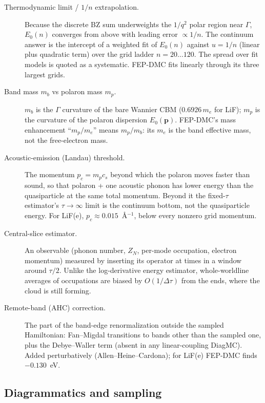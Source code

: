 \documentclass[11pt]{article}
\newcommand{\term}[1]{\item[#1.]}
\begin{document}
\begin{description}
\term{Thermodynamic limit / $1/n$ extrapolation} Because the discrete BZ sum
  underweights the $1/q^{2}$ polar region near $\Gamma$, $E_{0}(n)$ converges from
  above with leading error $\propto1/n$. The continuum answer is the intercept of a weighted fit of $E_{0}(n)$ against $u=1/n$ (linear plus quadratic term) over the grid ladder $n=20\ldots120$. The spread over fit models is quoted as a systematic. FEP-DMC fits linearly through its three largest grids.

\term{Band mass $m_{b}$ vs polaron mass $m_{p}$} $m_{b}$ is the $\Gamma$ curvature of the bare Wannier CBM ($0.6926\,m_{e}$ for LiF); $m_{p}$ is the curvature of the polaron dispersion $E_{0}(\mathbf p)$. FEP-DMC's mass enhancement ``$m_{p}/m_{e}$'' means $m_{p}/m_{b}$: its $m_{e}$ is the band effective mass, not the free-electron mass.

\term{Acoustic-emission (Landau) threshold} The momentum $p_{c}=m_{p}c_{s}$ beyond which the polaron moves faster than sound, so that polaron + one acoustic phonon has lower energy than the quasiparticle at the same total momentum. Beyond it the fixed-$\tau$ estimator's $\tau\to\infty$ limit is the continuum bottom, not the quasiparticle energy. For LiF(e), $p_{c}\approx0.015$~\AA$^{-1}$, below every nonzero grid momentum.

\term{Central-slice estimator} An observable (phonon number, $Z_{N}$, per-mode occupation, electron momentum) measured by inserting its operator at times in a window around $\tau/2$. Unlike the log-derivative energy estimator, whole-worldline averages of occupations are biased by $O(1/\Delta\tau)$ from the ends, where the cloud is still forming.

\term{Remote-band (AHC) correction} The part of the band-edge renormalization outside the sampled Hamiltonian: Fan--Migdal transitions to bands other than the sampled one, plus the Debye--Waller term (absent in any linear-coupling DiagMC). Added perturbatively (Allen--Heine--Cardona); for LiF(e) FEP-DMC finds $-0.130$~eV.
\end{description}

\subsection{Diagrammatics and sampling}
\end{document}
